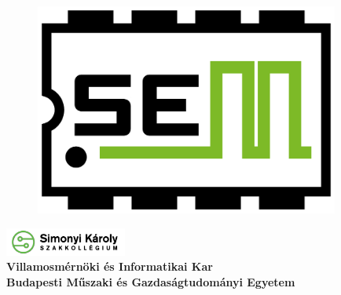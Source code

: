 \begin{titlepage}

\begin{figure}
\centering
\includegraphics[width=100mm,keepaspectratio]{images/logos/sem.png}
\end{figure}

\centering

\vspace{5mm}
\includegraphics[width=40mm,keepaspectratio]{images/logos/simonyi.png}  \\
\textbf{Villamosmérnöki és Informatikai Kar}\\
\textbf{Budapesti Műszaki és Gazdaságtudományi Egyetem}\\
\vspace{50mm}
\Huge
{\let\newpage\relax\maketitle}

\end{titlepage}